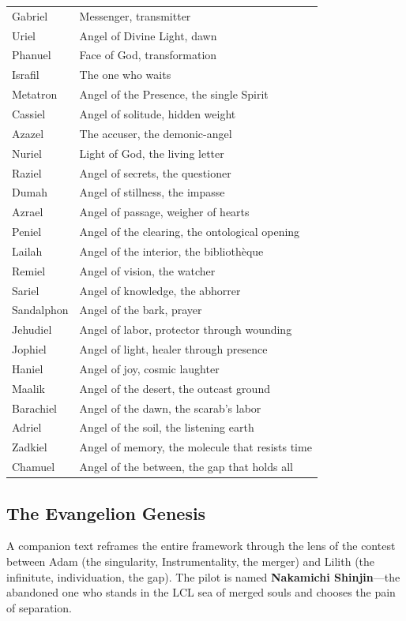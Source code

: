 \documentclass[12pt,a4paper]{article}
\begin{document}
\medskip
\begin{tabular}{ll}
Gabriel & Messenger, transmitter \\
Uriel & Angel of Divine Light, dawn \\
Phanuel & Face of God, transformation \\
Israfil & The one who waits \\
Metatron & Angel of the Presence, the single Spirit \\
Cassiel & Angel of solitude, hidden weight \\
Azazel & The accuser, the demonic-angel \\
Nuriel & Light of God, the living letter \\
Raziel & Angel of secrets, the questioner \\
Dumah & Angel of stillness, the impasse \\
Azrael & Angel of passage, weigher of hearts \\
Peniel & Angel of the clearing, the ontological opening \\
Lailah & Angel of the interior, the bibliothèque \\
Remiel & Angel of vision, the watcher \\
Sariel & Angel of knowledge, the abhorrer \\
Sandalphon & Angel of the bark, prayer \\
Jehudiel & Angel of labor, protector through wounding \\
Jophiel & Angel of light, healer through presence \\
Haniel & Angel of joy, cosmic laughter \\
Maalik & Angel of the desert, the outcast ground \\
Barachiel & Angel of the dawn, the scarab's labor \\
Adriel & Angel of the soil, the listening earth \\
Zadkiel & Angel of memory, the molecule that resists time \\
Chamuel & Angel of the between, the gap that holds all \\
\end{tabular}

\subsection{The Evangelion Genesis}

A companion text reframes the entire framework through the lens of the
contest between Adam (the singularity, Instrumentality, the merger) and
Lilith (the infinitute, individuation, the gap). The pilot is named
\textbf{Nakamichi Shinjin}---the abandoned one who stands in the LCL
sea of merged souls and chooses the pain of separation.
\end{document}
